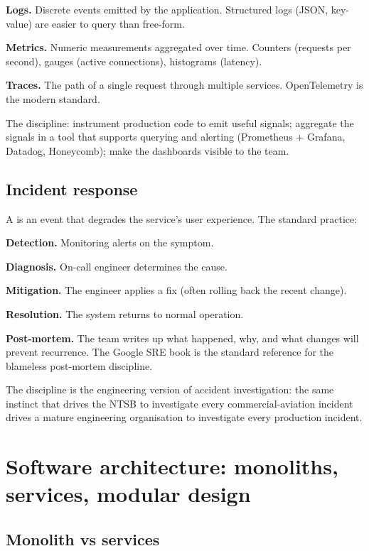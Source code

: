 \textbf{Logs.} Discrete events emitted by the application. Structured logs (JSON, key-value) are easier to query than free-form.

\textbf{Metrics.} Numeric measurements aggregated over time. Counters (requests per second), gauges (active connections), histograms (latency).

\textbf{Traces.} The path of a single request through multiple services. OpenTelemetry is the modern standard.

The discipline: instrument production code to emit useful signals; aggregate the signals in a tool that supports querying and alerting (Prometheus + Grafana, Datadog, Honeycomb); make the dashboards visible to the team.

\subsection{Incident response}

A  is an event that degrades the service's user experience. The standard practice:

\textbf{Detection.} Monitoring alerts on the symptom.

\textbf{Diagnosis.} On-call engineer determines the cause.

\textbf{Mitigation.} The engineer applies a fix (often rolling back the recent change).

\textbf{Resolution.} The system returns to normal operation.

\textbf{Post-mortem.} The team writes up what happened, why, and what changes will prevent recurrence. The Google SRE book \cite{text:google-sre} is the standard reference for the blameless post-mortem discipline.

The discipline is the engineering version of accident investigation: the same instinct that drives the NTSB to investigate every commercial-aviation incident drives a mature engineering organisation to investigate every production incident.

\section{Software architecture: monoliths, services, modular design}

\subsection{Monolith vs services}

